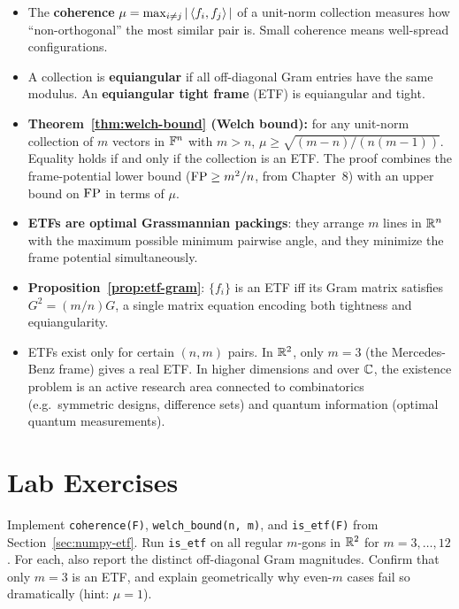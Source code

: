 \begin{itemize}
  \item The \textbf{coherence} $\mu=\max_{i\ne j}|\left\langle f_i, f_j \right\rangle|$ of a
        unit-norm collection measures how ``non-orthogonal'' the most
        similar pair is. Small coherence means well-spread configurations.

  \item A collection is \textbf{equiangular} if all off-diagonal Gram
        entries have the same modulus. An \textbf{equiangular tight
        frame} (ETF) is equiangular and tight.

  \item \textbf{Theorem~\ref{thm:welch-bound} (Welch bound):} for any
        unit-norm collection of $m$ vectors in $\mathbb{F}^n$ with $m>n$,
        $\mu\ge\sqrt{(m-n)/(n(m-1))}$. Equality holds if and only if
        the collection is an ETF. The proof combines the frame-potential
        lower bound ($\operatorname{FP}\ge m^2/n$, from Chapter~8) with an upper bound
        on $\operatorname{FP}$ in terms of $\mu$.

  \item \textbf{ETFs are optimal Grassmannian packings}: they arrange $m$
        lines in $\mathbb{R}^n$ with the maximum possible minimum pairwise angle,
        and they minimize the frame potential simultaneously.

  \item \textbf{Proposition~\ref{prop:etf-gram}}: $\{f_i\}$ is an ETF
        iff its Gram matrix satisfies $G^2=(m/n)G$, a single matrix
        equation encoding both tightness and equiangularity.

  \item ETFs exist only for certain $(n,m)$ pairs. In $\mathbb{R}^2$, only $m=3$
        (the Mercedes-Benz frame) gives a real ETF. In higher dimensions
        and over $\mathbb{C}$, the existence problem is an active research area
        connected to combinatorics (e.g.\ symmetric designs, difference
        sets) and quantum information (optimal quantum measurements).
\end{itemize}

\section{Lab Exercises}
\label{sec:lab-ch9}

\begin{exercisebox}[title={Lab Exercise 9.1: Regular Polygons and Equiangularity}]
Implement \texttt{coherence(F)}, \texttt{welch\_bound(n, m)}, and
\texttt{is\_etf(F)} from Section~\ref{sec:numpy-etf}. Run
\texttt{is\_etf} on all regular $m$-gons in $\mathbb{R}^2$ for $m=3,\ldots,12$.
For each, also report the distinct off-diagonal Gram magnitudes. Confirm
that only $m=3$ is an ETF, and explain geometrically why even-$m$ cases
fail so dramatically (hint: $\mu=1$).
\end{exercisebox}

